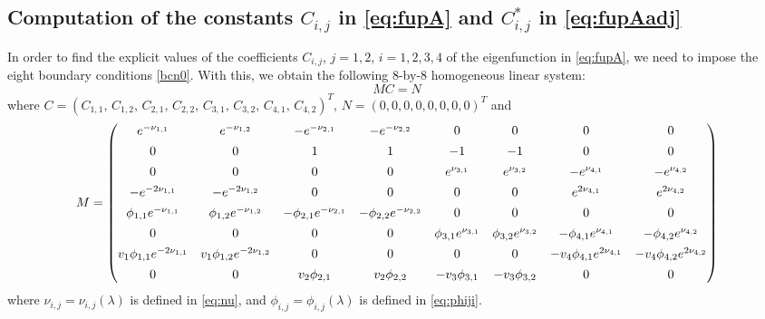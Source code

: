 \documentclass[a4paper]{article}
\newcommand{\X}[3]{#1_{#3,#2}}
\newcommand{\Xe}[3]{#1^*_{#3,#2}}
\numberwithin{equation}{section}
\begin{document}
\subsection{Computation of the constants $\X{C}{j}{i}$ in \eqref{eq:fupA} and $\Xe{C}{j}{i}$ in \eqref{eq:fupAadj} } \label{sec:Cji}

In order to find the explicit values of the coefficients $\X{C}{j}{i}$, $j=1,2$, $i=1,2,3,4$ of the eigenfunction in \eqref{eq:fupA}, we need to impose the eight boundary conditions \eqref{bcn0}. With this, we obtain the following 8-by-8 homogeneous linear system:
\begin{equation}\label{eq:sistCij}
MC=N
\end{equation}
where $C =\left( \X{C}{1}{1},\, \X{C}{2}{1},\, \X{C}{1}{2},\, \X{C}{2}{2},\, \X{C}{1}{3},\, \X{C}{2}{3},\, \X{C}{1}{4},\, \X{C}{2}{4} \right)^T$, $N =\left( 0,0,0,0,0,0,0,0 \right)^T$
and
\tiny
$$M=\begin{pmatrix}
e^{-\X{\nu}{1}{1}} & e^{-\X{\nu}{2}{1}} & -e^{-\X{\nu}{1}{2}} & -e^{-\X{\nu}{2}{2}} & 0 & 0 & 0 & 0 \vspace{0.15cm} \\
0 & 0 & 1 & 1 & -1 & -1 & 0 & 0 \vspace{0.15cm}\\
0 & 0 & 0 & 0 & e^{\X{\nu}{1}{3}} & e^{\X{\nu}{2}{3}} & -e^{\X{\nu}{1}{4}} & -e^{\X{\nu}{2}{4}} \vspace{0.15cm} \\
-e^{-2\X{\nu}{1}{1}} & -e^{-2\X{\nu}{2}{1}} &0 & 0 & 0 & 0 & e^{2\X{\nu}{1}{4}} & e^{2\X{\nu}{2}{4}} \vspace{0.15cm} \\
\X{\phi}{1}{1}e^{-\X{\nu}{1}{1}} & \X{\phi}{2}{1}e^{-\X{\nu}{2}{1}} & -\X{\phi}{1}{2}e^{-\X{\nu}{1}{2}} & -\X{\phi}{2}{2}e^{-\X{\nu}{2}{2}} & 0 & 0 & 0 & 0 \vspace{0.15cm}\\
0 & 0 & 0 & 0 & \X{\phi}{1}{3}e^{\X{\nu}{1}{3}} & \X{\phi}{2}{3}e^{\X{\nu}{2}{3}} & -\X{\phi}{1}{4}e^{\X{\nu}{1}{4}} & -\X{\phi}{2}{4}e^{\X{\nu}{2}{4}} \vspace{0.15cm}\\
v_1\X{\phi}{1}{1}e^{-2\X{\nu}{1}{1}} & v_1\X{\phi}{2}{1}e^{-2\X{\nu}{2}{1}} &0 & 0 & 0 & 0 & -v_4\X{\phi}{1}{4}e^{2\X{\nu}{1}{4}} & -v_4\X{\phi}{2}{4}e^{2\X{\nu}{2}{4}}\vspace{0.15cm} \\
0 & 0 & v_2\X{\phi}{1}{2} & v_2\X{\phi}{2}{2} & -v_3\X{\phi}{1}{3} & -v_3\X{\phi}{2}{3} & 0 & 0
\end{pmatrix}$$
\normalsize
where $\X{\nu}{j}{i}=\X{\nu}{j}{i}(\lambda)$ is defined in \eqref{eq:nu}, and $\X{\phi}{j}{i}=\X{\phi}{j}{i}(\lambda)$ is defined in \eqref{eq:phiji}.
\end{document}
